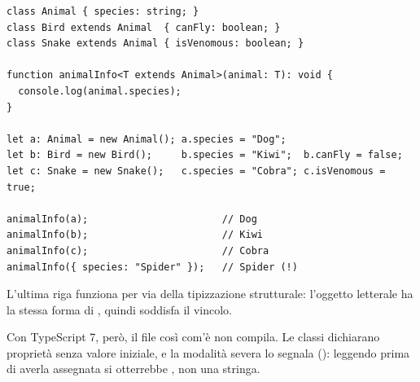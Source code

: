 \begin{affianco}[0.6][c]
\codicepiccolo
\begin{lstlisting}[style=ts, name=constraints.ts]
class Animal { species: string; }
class Bird extends Animal  { canFly: boolean; }
class Snake extends Animal { isVenomous: boolean; }

function animalInfo<T extends Animal>(animal: T): void {
  console.log(animal.species);
}

let a: Animal = new Animal(); a.species = "Dog";
let b: Bird = new Bird();     b.species = "Kiwi";  b.canFly = false;
let c: Snake = new Snake();   c.species = "Cobra"; c.isVenomous = true;

animalInfo(a);                       // Dog
animalInfo(b);                       // Kiwi
animalInfo(c);                       // Cobra
animalInfo({ species: "Spider" });   // Spider (!)
\end{lstlisting}
\risultato
\begin{immagine}
\end{immagine}
\end{affianco}

L'ultima riga funziona per via della tipizzazione strutturale: l'oggetto
letterale ha la stessa forma di , quindi soddisfa il vincolo.

Con TypeScript 7, però, il file così com'è non compila. Le classi dichiarano
proprietà senza valore iniziale, e la modalità severa lo segnala
(): leggendo  prima di averla assegnata si
otterrebbe , non una stringa.

